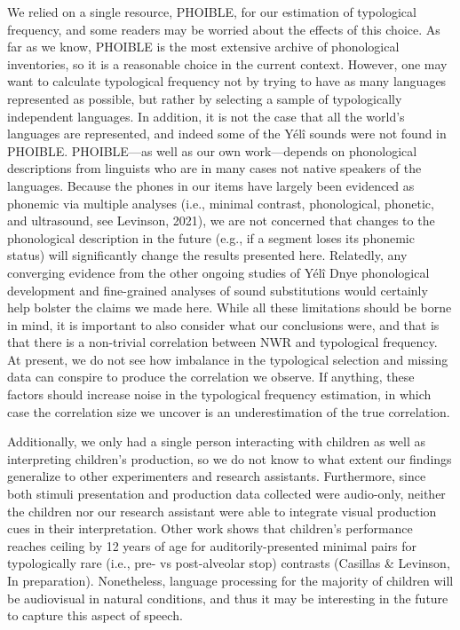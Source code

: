 \documentclass[
  american,
  ,man,floatsintext]{apa6}
\begin{document}
We relied on a single resource, PHOIBLE, for our estimation of typological frequency, and some readers may be worried about the effects of this choice. As far as we know, PHOIBLE is the most extensive archive of phonological inventories, so it is a reasonable choice in the current context. However, one may want to calculate typological frequency not by trying to have as many languages represented as possible, but rather by selecting a sample of typologically independent languages. In addition, it is not the case that all the world's languages are represented, and indeed some of the Yélî sounds were not found in PHOIBLE. PHOIBLE---as well as our own work---depends on phonological descriptions from linguists who are in many cases not native speakers of the languages. Because the phones in our items have largely been evidenced as phonemic via multiple analyses (i.e., minimal contrast, phonological, phonetic, and ultrasound, see Levinson, 2021), we are not concerned that changes to the phonological description in the future (e.g., if a segment loses its phonemic status) will significantly change the results presented here. Relatedly, any converging evidence from the other ongoing studies of Yélî Dnye phonological development and fine-grained analyses of sound substitutions would certainly help bolster the claims we made here. While all these limitations should be borne in mind, it is important to also consider what our conclusions were, and that is that there is a non-trivial correlation between NWR and typological frequency. At present, we do not see how imbalance in the typological selection and missing data can conspire to produce the correlation we observe. If anything, these factors should increase noise in the typological frequency estimation, in which case the correlation size we uncover is an underestimation of the true correlation.

Additionally, we only had a single person interacting with children as well as interpreting children's production, so we do not know to what extent our findings generalize to other experimenters and research assistants. Furthermore, since both stimuli presentation and production data collected were audio-only, neither the children nor our research assistant were able to integrate visual production cues in their interpretation. Other work shows that children's performance reaches ceiling by 12 years of age for auditorily-presented minimal pairs for typologically rare (i.e., pre- vs post-alveolar stop) contrasts (Casillas \& Levinson, In preparation). Nonetheless, language processing for the majority of children will be audiovisual in natural conditions, and thus it may be interesting in the future to capture this aspect of speech.
\end{document}
